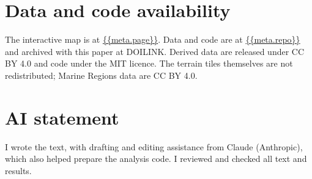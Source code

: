 \documentclass[11pt,a4paper]{article}
\begin{document}
\section*{Data and code availability}
The interactive map is at \url{{{meta.page}}}. Data and code are at \url{{{meta.repo}}} and archived with this paper at {{DOILINK}}. Derived data are released under CC BY 4.0 and code under the MIT licence. The terrain tiles themselves are not redistributed; Marine Regions data are CC BY 4.0.

\section*{AI statement}
I wrote the text, with drafting and editing assistance from Claude (Anthropic), which also helped prepare the analysis code. I reviewed and checked all text and results.
\end{document}
